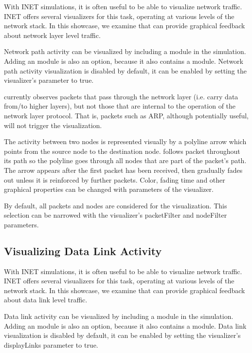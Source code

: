 With INET simulations, it is often useful to be able to visualize network
traffic. INET offers several visualizers for this task, operating at various
levels of the network stack. In this showcase, we examine 
that can provide graphical feedback about network layer level traffic.

Network path activity can be visualized by including a 
module in the simulation. Adding an  module is also an
option, because it also contains a  module. Network path
activity visualization is disabled by default, it can be enabled by setting the
visualizer's  parameter to true.

 currently observes packets that pass through the network
layer (i.e. carry data from/to higher layers), but not those that are internal
to the operation of the network layer protocol. That is, packets such as ARP,
although potentially useful, will not trigger the visualization.

The activity between two nodes is represented visually by a polyline arrow which
points from the source node to the destination node. 
follows packet throughout its path so the polyline goes through all nodes that
are part of the packet's path. The arrow appears after the first packet has been
received, then gradually fades out unless it is reinforced by further packets.
Color, fading time and other graphical properties can be changed with parameters
of the visualizer.

By default, all packets and nodes are considered for the visualization. This
selection can be narrowed with the visualizer's packetFilter and nodeFilter
parameters.


\subsection{Visualizing Data Link Activity}

With INET simulations, it is often useful to be able to visualize network
traffic. INET offers several visualizers for this task, operating at various
levels of the network stack. In this showcase, we examine 
that can provide graphical feedback about data link level traffic.

Data link activity can be visualized by including a  module in
the simulation. Adding an  module is also an option, because
it also contains a  module. Data link visualization is
disabled by default, it can be enabled by setting the visualizer's displayLinks
parameter to true.

